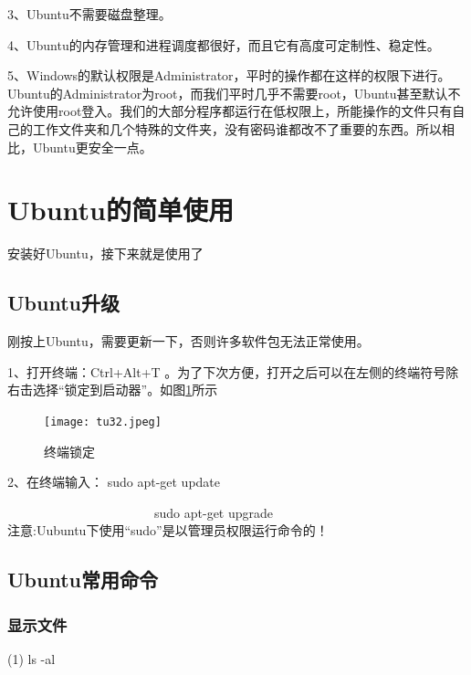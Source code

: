 \documentclass{article}
\begin{document}
3、Ubuntu不需要磁盘整理。

4、Ubuntu的内存管理和进程调度都很好，而且它有高度可定制性、稳定性。

5、Windows的默认权限是Administrator，平时的操作都在这样的权限下进行。Ubuntu的Administrator为root，而我们平时几乎不需要root，Ubuntu甚至默认不允许使用root登入。我们的大部分程序都运行在低权限上，所能操作的文件只有自己的工作文件夹和几个特殊的文件夹，没有密码谁都改不了重要的东西。所以相比，Ubuntu更安全一点。
\section{Ubuntu的简单使用}
 安装好Ubuntu，接下来就是使用了
\subsection{Ubuntu升级}
  刚按上Ubuntu，需要更新一下，否则许多软件包无法正常使用。

 1、打开终端：Ctrl+Alt+T 。为了下次方便，打开之后可以在左侧的终端符号除右击选择“锁定到启动器”。如图\ref{tu32}所示

\begin{figure}[!htb] %
\centering
\texttt{[image: tu32.jpeg]}
\caption{\small 终端锁定}
\label{tu32}
\end{figure} 

 2、在终端输入： sudo apt-get update

~~~~~~~~~~~~~~~~~~~~~~~sudo apt-get upgrade\\
{\color{red}注意:}Uubuntu下使用{\color{red}“sudo”}是以管理员权限运行命令的！
\subsection{Ubuntu常用命令}
\subsubsection{显示文件}
 (1) ls -al
\end{document}
